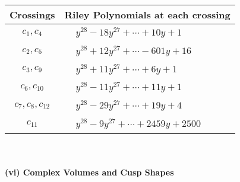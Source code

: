 \documentclass[1p]{elsarticle_modified}
\theoremstyle{definition}
\begin{document}
\begin{tabular}{m{50pt}|m{274pt}}
Crossings & \hspace{64pt}Riley Polynomials at each crossing \\
\hline $$\begin{aligned}c_{1},c_{4}\end{aligned}$$&$\begin{aligned}
&y^{28}-18 y^{27}+\cdots+10 y+1
\end{aligned}$\\
\hline $$\begin{aligned}c_{2},c_{5}\end{aligned}$$&$\begin{aligned}
&y^{28}+12 y^{27}+\cdots-601 y+16
\end{aligned}$\\
\hline $$\begin{aligned}c_{3},c_{9}\end{aligned}$$&$\begin{aligned}
&y^{28}+11 y^{27}+\cdots+6 y+1
\end{aligned}$\\
\hline $$\begin{aligned}c_{6},c_{10}\end{aligned}$$&$\begin{aligned}
&y^{28}-11 y^{27}+\cdots+11 y+1
\end{aligned}$\\
\hline $$\begin{aligned}c_{7},c_{8},c_{12}\end{aligned}$$&$\begin{aligned}
&y^{28}-29 y^{27}+\cdots+19 y+4
\end{aligned}$\\
\hline $$\begin{aligned}c_{11}\end{aligned}$$&$\begin{aligned}
&y^{28}-9 y^{27}+\cdots+2459 y+2500
\end{aligned}$\\
\hline
\end{tabular}\\~\\
\newpage\flushleft \textbf{(vi) Complex Volumes and Cusp Shapes}
\end{document}
